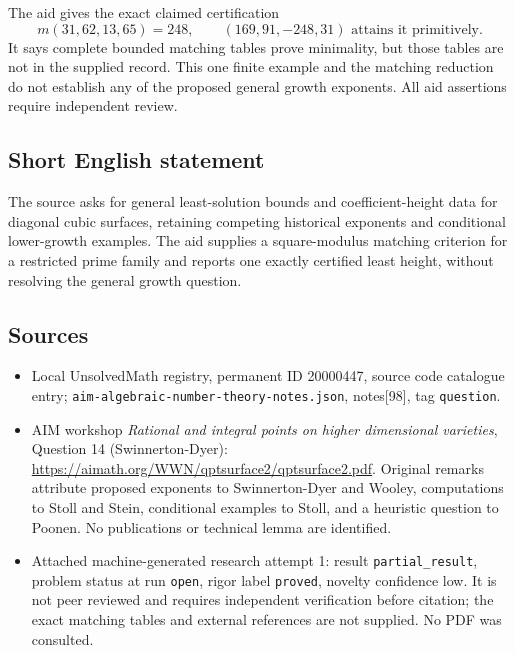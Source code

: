 \documentclass[11pt]{article}
\begin{document}
The aid gives the exact claimed certification
\[m(31,62,13,65)=248,\qquad (169,91,-248,31)\text{ attains it primitively}.\]
It says complete bounded matching tables prove minimality, but those tables are not in the supplied record. This one finite example and the matching reduction do not establish any of the proposed general growth exponents. All aid assertions require independent review.
\subsection{Short English statement}
The source asks for general least-solution bounds and coefficient-height data for diagonal cubic surfaces, retaining competing historical exponents and conditional lower-growth examples. The aid supplies a square-modulus matching criterion for a restricted prime family and reports one exactly certified least height, without resolving the general growth question.
\subsection{Sources}
\begin{itemize}
\item Local UnsolvedMath registry, permanent ID 20000447, source code catalogue entry; \texttt{aim-algebraic-number-theory-notes.json}, notes[98], tag \texttt{question}.
\item AIM workshop \emph{Rational and integral points on higher dimensional varieties}, Question 14 (Swinnerton-Dyer): \url{https://aimath.org/WWN/qptsurface2/qptsurface2.pdf}. Original remarks attribute proposed exponents to Swinnerton-Dyer and Wooley, computations to Stoll and Stein, conditional examples to Stoll, and a heuristic question to Poonen. No publications or technical lemma are identified.
\item Attached machine-generated research attempt 1: result \texttt{partial\_result}, problem status at run \texttt{open}, rigor label \texttt{proved}, novelty confidence low. It is not peer reviewed and requires independent verification before citation; the exact matching tables and external references are not supplied. No PDF was consulted.
\end{itemize}
\end{document}
